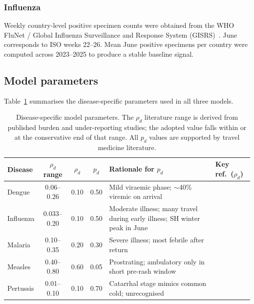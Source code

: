\documentclass[12pt]{article}
\begin{document}
\subsubsection*{Influenza}

Weekly country-level positive specimen counts were obtained from the
WHO FluNet / Global Influenza Surveillance and Response System
(GISRS)~\cite{WHO_immunization}. June corresponds to ISO weeks 22--26.
Mean June positive specimens per country were computed across
2023--2025 to produce a stable baseline signal.

\subsection*{Model parameters}

Table~\ref{tab:params} summarises the disease-specific parameters
used in all three models.

\begin{table}[h!]
\centering
\caption{Disease-specific model parameters. The $\rho_d$ literature
  range is derived from published burden and under-reporting studies;
  the adopted value falls within or at the conservative end of that
  range. All $p_d$ values are supported by travel medicine literature.}
\label{tab:params}
\small
\begin{tabular}{lcccp{3.5cm}p{3.2cm}}
\toprule
\textbf{Disease}
  & \textbf{$\rho_d$ range}
  & \textbf{$\rho_d$}
  & \textbf{$p_d$}
  & \textbf{Rationale for $p_d$}
  & \textbf{Key ref.\ ($\rho_d$)} \\
\midrule
Dengue
  & 0.06--0.26 & 0.10 & 0.50
  & Mild viraemic phase; $\sim$40\% viremic on arrival
  & \cite{bhatt2013,undurraga2013} \\[3pt]
Influenza
  & 0.033--0.20 & 0.10 & 0.50
  & Moderate illness; many travel during early illness; SH winter peak in June
  & \cite{WHO_immunization} \\[3pt]
Malaria
  & 0.10--0.35 & 0.20 & 0.30
  & Severe illness; most febrile after return
  & \cite{whoWMR2024} \\[3pt]
Measles
  & 0.40--0.80 & 0.60 & 0.05
  & Prostrating; ambulatory only in short pre-rash window
  & \cite{simons2012} \\[3pt]
Pertussis
  & 0.01--0.10 & 0.10 & 0.70
  & Catarrhal stage mimics common cold; unrecognised
  & \cite{mclaughlin2016} \\
\bottomrule
\end{tabular}
\normalsize
\end{table}
\end{document}
